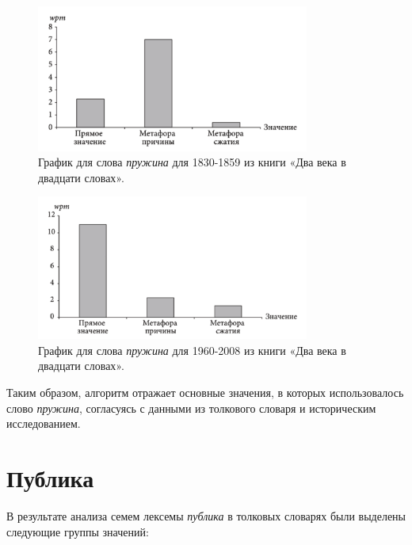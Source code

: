 \noindent %
\begin{figure}[H]
    \centering %
    \includegraphics[width=0.8\textwidth]{img/book/pruzhina/1830-1859}
    \caption{График для слова \textit{пружина} для 1830-1859 из книги «Два века в двадцати словах».}
\end{figure}

\begin{figure}[H]
    \centering %
    \includegraphics[width=0.8\textwidth]{img/book/pruzhina/1960-2008}
    \caption{График для слова \textit{пружина} для 1960-2008 из книги «Два века в двадцати словах».}
\end{figure}

Таким образом, алгоритм отражает основные значения, в которых использовалось
слово \textit{пружина}, согласуясь с данными из толкового словаря и историческим исследованием.

\section*{Публика}

В результате анализа семем лексемы \textit{публика} в толковых словарях были выделены следующие группы значений:

